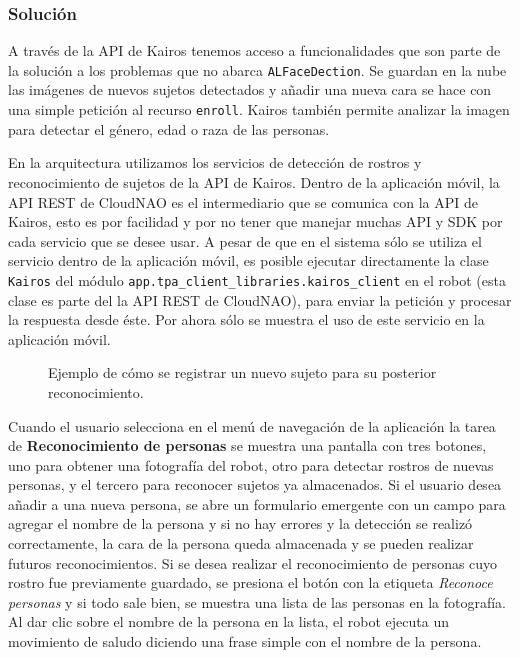 \subsubsection{Solución}

A través de la API de Kairos tenemos acceso
a funcionalidades que son parte de la solución 
a los problemas que no abarca \texttt{ALFaceDection}.
Se guardan en la nube las imágenes de nuevos sujetos
detectados y añadir una nueva cara se hace
con una simple petición al recurso \texttt{enroll}.
Kairos también permite analizar la imagen para detectar el género, 
edad o raza de las personas.

En la arquitectura utilizamos los servicios de detección de rostros y reconocimiento
de sujetos de la API de Kairos.
Dentro de la aplicación móvil, la API REST de CloudNAO es el intermediario
que se comunica con la API de Kairos, esto es por facilidad y por no
tener que manejar muchas API y SDK por cada servicio que se desee usar.
A pesar de que en el sistema sólo se utiliza el servicio
dentro de la aplicación móvil, es posible ejecutar directamente la clase
\texttt{Kairos} del módulo \texttt{app.tpa\_client\_libraries.kairos\_client}
en el robot (esta clase es parte del la API REST de CloudNAO), para enviar la petición y procesar la respuesta desde éste.
Por ahora sólo se muestra el uso de este servicio en la aplicación móvil.

\begin{figure}[htbp]
    \centering
    \qquad
    \qquad
    \caption{Ejemplo de cómo se registrar un nuevo sujeto para su posterior reconocimiento.}
\end{figure}
Cuando el usuario selecciona en el menú de navegación de la aplicación
la tarea de \textbf{Reconocimiento de personas} se muestra una pantalla 
con tres botones, uno para obtener una fotografía del robot, otro para
detectar rostros de nuevas personas, y el tercero para reconocer sujetos
ya almacenados. Si el usuario desea añadir a una nueva persona, se abre un
formulario emergente con un campo para agregar el nombre de la persona y
si no hay errores y la detección se realizó correctamente,
la cara de la persona queda almacenada y se pueden realizar futuros reconocimientos.
Si se desea realizar el reconocimiento de personas cuyo rostro
fue previamente guardado, se presiona el botón con la etiqueta
\textit{Reconoce personas} y si todo sale bien,
se muestra una lista de las personas en la fotografía.
Al dar clic sobre el nombre de la persona en la lista, el robot ejecuta
un movimiento de saludo diciendo una frase simple con el nombre de la persona.



